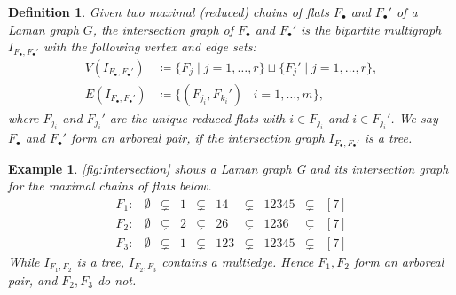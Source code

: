 \documentclass[11pt,reqno,a4paper]{amsart}
\theoremstyle{theoremstyle}
\theoremstyle{examplestyle}
\newtheorem{example}[theorem]{Example}
\newtheorem{definition}[theorem]{Definition}
\theoremstyle{algorithmstyle}
\begin{document}
\begin{definition}
  \label{def:arboreal}
  Given two maximal (reduced) chains of flats $F_\bullet$ and $F_\bullet'$ of a Laman graph $G$, the \emph{intersection graph} of $F_\bullet$ and $F_\bullet'$ is the bipartite multigraph $I_{F_\bullet,F_\bullet'}$ with the following vertex and edge sets:
  \begin{align*}
    V(I_{F_\bullet,F_\bullet'})&\coloneqq\{F_j\mid j=1,\dots,r\}\sqcup\{F_j'\mid j=1,\dots,r\},\\
    E(I_{F_\bullet,F_\bullet'})&\coloneqq\{ (F_{j_i},F_{k_i}') \mid i=1,\dots,m\},
  \end{align*}
  where $F_{j_i}$ and $F_{j_i}'$ are the unique reduced flats with $i\in F_{j_i}$ and $i\in F_{j_i}'$.
  We say $F_\bullet$ and $F_\bullet'$ form an \emph{arboreal pair}, if the intersection graph $I_{F_\bullet,F_\bullet'}$ is a tree.
\end{definition}

\begin{example}
  \label{ex:arboreal}
  \cref{fig:Intersection} shows a Laman graph G and its intersection graph for the maximal chains of flats below.
  \begin{equation*}
    \begin{array}{rccccccccc}
      F_1 \colon &\emptyset&\subsetneq &1&\subsetneq& 14 &\subsetneq& 12345&\subsetneq& [7]\\
      F_2 \colon &\emptyset&\subsetneq &2&\subsetneq& 26 &\subsetneq& 1236 &\subsetneq& [7]\\
      F_3 \colon &\emptyset&\subsetneq &1&\subsetneq& 123&\subsetneq& 12345&\subsetneq& [7]
    \end{array}
  \end{equation*}
  While $I_{F_1,F_2}$ is a tree, $I_{F_2,F_3}$ contains a multiedge.  Hence $F_1,F_2$ form an arboreal pair, and $F_2, F_3$ do not.
\end{example}
\end{document}
